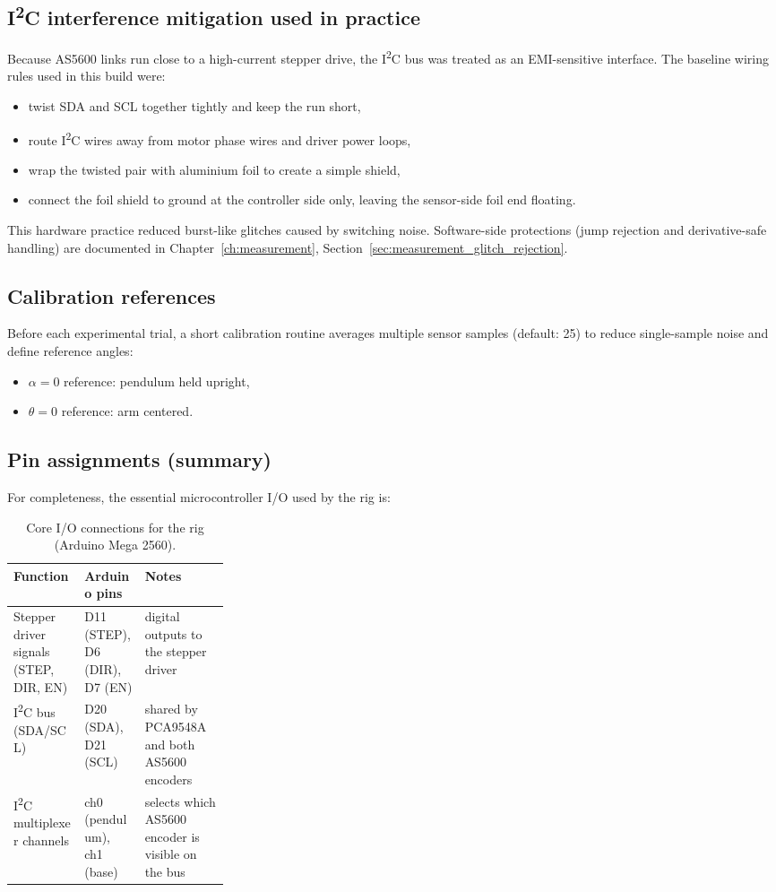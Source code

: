 \subsection*{I\textsuperscript{2}C interference mitigation used in practice}
Because AS5600 links run close to a high-current stepper drive, the I\textsuperscript{2}C bus was treated as an EMI-sensitive interface. The baseline wiring rules used in this build were:
\begin{itemize}
  \item twist SDA and SCL together tightly and keep the run short,
  \item route I\textsuperscript{2}C wires away from motor phase wires and driver power loops,
  \item wrap the twisted pair with aluminium foil to create a simple shield,
  \item connect the foil shield to ground at the controller side only, leaving the sensor-side foil end floating.
\end{itemize}
This hardware practice reduced burst-like glitches caused by switching noise. Software-side protections (jump rejection and derivative-safe handling) are documented in Chapter~\ref{ch:measurement}, Section~\ref{sec:measurement_glitch_rejection}.

\subsection*{Calibration references}
Before each experimental trial, a short calibration routine averages multiple sensor samples (default: 25) to reduce single-sample noise and define reference angles:
\begin{itemize}
  \item $\alpha=0$ reference: pendulum held upright,
  \item $\theta=0$ reference: arm centered.
\end{itemize}

\subsection*{Pin assignments (summary)}
For completeness, the essential microcontroller I/O used by the rig is:
\begin{table}[htbp]
  \centering
  \small
  \setlength{\tabcolsep}{6pt}
  \caption{Core I/O connections for the rig (Arduino Mega 2560).}
  \label{tab:pin_map}
  \begin{tabularx}{\linewidth}{@{}l p{0.28\linewidth} X@{}}
    \toprule
    Function & Arduino pins & Notes \\
    \midrule
    Stepper driver signals (STEP, DIR, EN) & D11 (STEP), D6 (DIR), D7 (EN) & digital outputs to the stepper driver \\
    I\textsuperscript{2}C bus (SDA/SCL) & D20 (SDA), D21 (SCL) & shared by PCA9548A and both AS5600 encoders \\
    I\textsuperscript{2}C multiplexer channels & ch0 (pendulum), ch1 (base) & selects which AS5600 encoder is visible on the bus \\
    \bottomrule
  \end{tabularx}
\end{table}

